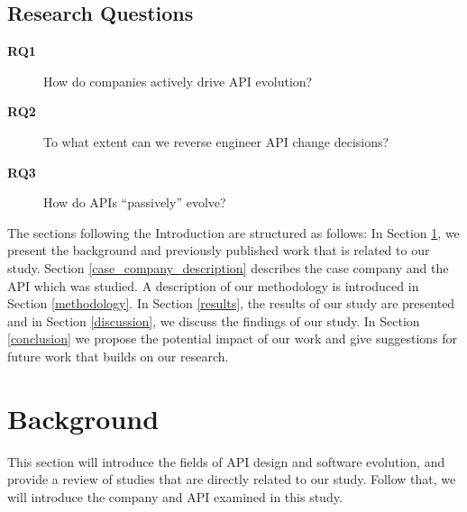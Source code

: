 \documentclass{sig-alternate}
\begin{document}


\subsection{Research Questions} \label{rqs}
\begin{description}
\item[\textbf{RQ1}] How do companies actively drive API evolution?
\item[\textbf{RQ2}] To what extent can we reverse engineer API change decisions?
\item[\textbf{RQ3}] How do APIs ``passively'' evolve?


\end{description}

The sections following the Introduction are structured as follows: In Section \ref{existing_literature}, we present the background and previously published work that is related to our study. Section \ref{case_company_description} describes the case company and the API which was studied. A description of our methodology is introduced in Section \ref{methodology}. In Section \ref{results}, the results of our study are presented and in Section \ref{discussion}, we discuss the findings of our study. In Section \ref{conclusion} we propose the potential impact of our work and give suggestions for future work that builds on our research. 

\section{Background} \label{existing_literature}
This section will introduce the fields of API design and software evolution, and provide a review of studies that are directly related to our study. Follow that, we will introduce the company and API examined in this study. 
\end{document}
